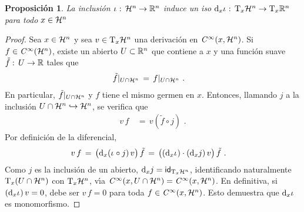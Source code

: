 \theoremstyle{plain}
\newtheorem{propoTangenteEnElBorde}{Proposici\'{o}n}[section]

\theoremstyle{remark}


\begin{propoTangenteEnElBorde}\label{propo:tangenteenelborde}
	La inclusi\'{o}n $\inc:\,\hemi[n]\rightarrow\bb R^n$ induce un iso
	\begin{math}
		\diferencial[x]{\inc}:\,\tangente[x]{\hemi[n]}\rightarrow
			\tangente[x]{\bb R^n}
	\end{math} para todo $x\in\hemi[n]$
\end{propoTangenteEnElBorde}

\begin{proof}
	Sea $x\in\hemi[n]$ y sea $v\in\tangente[x]{\hemi[n]}$ una
	derivaci\'{o}n en $\suaves{x,\hemi[n]}$. Si $f\in\suaves{\hemi[n]}$,
	existe un abierto $U\subset\bb R^n$ que contiene a $x$ y una
	funci\'{o}n suave $\tilde f:\,U\rightarrow\bb R$ tales que
	\begin{align*}
		\tilde f|_{U\cap\hemi[n]} & \,=\,f|_{U\cap\hemi[n]}
		\text{ .}
	\end{align*}
	En particular, $\tilde f|_{U\cap\hemi[n]}$ y $f$ tiene el mismo germen
	en $x$. Entonces, llamando $j$ a la inclusi\'{o}n
	$U\cap\hemi[n]\hookrightarrow\hemi[n]$, se verifica que
	\begin{align*}
		v\,f & \,=\,v(\tilde f\circ j)
		\text{ .}
	\end{align*}
	Por definici\'{o}n de la diferencial,
	\begin{align*}
		v\,f & \,=\,\big(
			\diferencial[x]{(\inc\circ j)}\,v\big)\,\tilde f \,=\,
			\big((\diferencial[x]{\inc})\cdot
				(\diferencial[x]{j})\,v\big)\,\tilde f
		\text{ .}
	\end{align*}
	Como $j$ es la inclusi\'{o}n de un abierto,
	$\diferencial[x]{j}=\id[{\tangente[x]{\hemi[n]}}]$, identificando
	naturalmente $\tangente[x]{(U\cap\hemi[n])}$ con
	$\tangente[x]{\hemi[n]}$, v\'{\i}a
	$\suaves{x,U\cap\hemi[n]}=\suaves{x,\hemi[n]}$. En definitiva, si
	$(\diferencial[x]{\inc})\,v=0$, debe ser $v\,f=0$ para toda
	$f\in\suaves{x,\hemi[n]}$. Esto demuestra que $\diferencial[x]{\inc}$
	es monomorfismo.


\end{proof}
